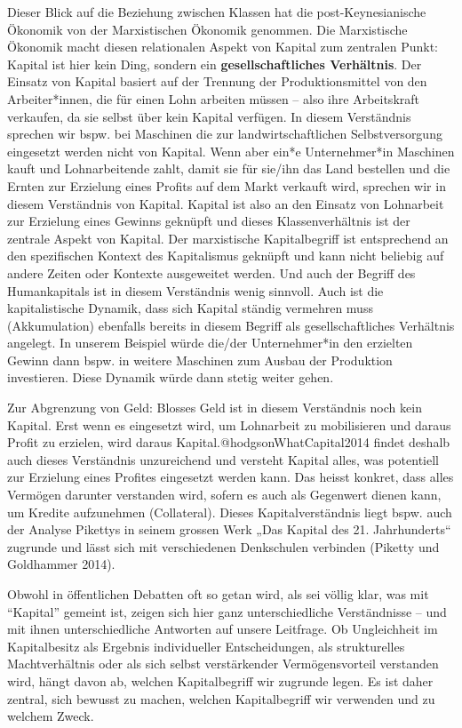 \documentclass[
  nswissgerman,
  a4paper,
  DIV=11,
  numbers=noendperiod,
  oneside,
  openany]{scrreprt}
\begin{document}
Dieser Blick auf die Beziehung zwischen Klassen hat die
post-Keynesianische Ökonomik von der Marxistischen Ökonomik genommen.
Die Marxistische Ökonomik macht diesen relationalen Aspekt von Kapital
zum zentralen Punkt: Kapital ist hier kein Ding, sondern ein
\textbf{gesellschaftliches Verhältnis}. Der Einsatz von Kapital basiert
auf der Trennung der Produktionsmittel von den Arbeiter*innen, die für
einen Lohn arbeiten müssen -- also ihre Arbeitskraft verkaufen, da sie
selbst über kein Kapital verfügen. In diesem Verständnis sprechen wir
bspw. bei Maschinen die zur landwirtschaftlichen Selbstversorgung
eingesetzt werden nicht von Kapital. Wenn aber ein*e Unternehmer*in
Maschinen kauft und Lohnarbeitende zahlt, damit sie für sie/ihn das Land
bestellen und die Ernten zur Erzielung eines Profits auf dem Markt
verkauft wird, sprechen wir in diesem Verständnis von Kapital. Kapital
ist also an den Einsatz von Lohnarbeit zur Erzielung eines Gewinns
geknüpft und dieses Klassenverhältnis ist der zentrale Aspekt von
Kapital. Der marxistische Kapitalbegriff ist entsprechend an den
spezifischen Kontext des Kapitalismus geknüpft und kann nicht beliebig
auf andere Zeiten oder Kontexte ausgeweitet werden. Und auch der Begriff
des Humankapitals ist in diesem Verständnis wenig sinnvoll. Auch ist die
kapitalistische Dynamik, dass sich Kapital ständig vermehren muss
(Akkumulation) ebenfalls bereits in diesem Begriff als
gesellschaftliches Verhältnis angelegt. In unserem Beispiel würde
die/der Unternehmer*in den erzielten Gewinn dann bspw. in weitere
Maschinen zum Ausbau der Produktion investieren. Diese Dynamik würde
dann stetig weiter gehen.

Zur Abgrenzung von Geld: Blosses Geld ist in diesem Verständnis noch
kein Kapital. Erst wenn es eingesetzt wird, um Lohnarbeit zu
mobilisieren und daraus Profit zu erzielen, wird daraus
Kapital.@hodgsonWhatCapital2014 findet deshalb auch dieses Verständnis
unzureichend und versteht Kapital alles, was potentiell zur Erzielung
eines Profites eingesetzt werden kann. Das heisst konkret, dass alles
Vermögen darunter verstanden wird, sofern es auch als Gegenwert dienen
kann, um Kredite aufzunehmen (Collateral). Dieses Kapitalverständnis
liegt bspw. auch der Analyse Pikettys in seinem grossen Werk „Das
Kapital des 21. Jahrhunderts`` zugrunde und lässt sich mit verschiedenen
Denkschulen verbinden (Piketty und Goldhammer 2014).

Obwohl in öffentlichen Debatten oft so getan wird, als sei völlig klar,
was mit ``Kapital'' gemeint ist, zeigen sich hier ganz unterschiedliche
Verständnisse -- und mit ihnen unterschiedliche Antworten auf unsere
Leitfrage. Ob Ungleichheit im Kapitalbesitz als Ergebnis individueller
Entscheidungen, als strukturelles Machtverhältnis oder als sich selbst
verstärkender Vermögensvorteil verstanden wird, hängt davon ab, welchen
Kapitalbegriff wir zugrunde legen. Es ist daher zentral, sich bewusst zu
machen, welchen Kapitalbegriff wir verwenden und zu welchem Zweck.
\end{document}

